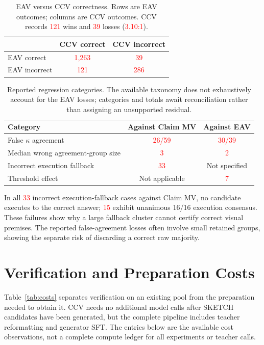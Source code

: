 \documentclass{article}
\newcommand{\recheck}[1]{\textcolor{red}{#1}}
\begin{document}
\begin{table}[h]
\centering
\caption{EAV versus CCV correctness. Rows are EAV outcomes; columns are CCV outcomes. CCV records \recheck{121} wins and \recheck{39} losses (\recheck{3.10:1}).}
\label{tab:exchange-eav}
\small
\begin{tabular}{lcc}
\toprule
 & CCV correct & CCV incorrect \\
\midrule
EAV correct & \recheck{1,263} & \recheck{39} \\
EAV incorrect & \recheck{121} & \recheck{286} \\
\bottomrule
\end{tabular}
\end{table}

\begin{table}[h]
\centering
\caption{Reported regression categories. The available taxonomy does not exhaustively account for the EAV losses; categories and totals await reconciliation rather than assigning an unsupported residual.}
\label{tab:regression-types}
\small
\begin{tabular}{lcc}
\toprule
Category & Against Claim MV & Against EAV \\
\midrule
False $\kappa$ agreement & \recheck{26/59} & \recheck{30/39} \\
Median wrong agreement-group size & \recheck{3} & \recheck{2} \\
Incorrect execution fallback & \recheck{33} & Not specified \\
Threshold effect & Not applicable & \recheck{7} \\
\bottomrule
\end{tabular}
\end{table}

In all \recheck{33} incorrect execution-fallback cases against Claim MV, no candidate executes to the correct answer; \recheck{15} exhibit unanimous 16/16 execution consensus. These failures show why a large fallback cluster cannot certify correct visual premises. The reported false-agreement losses often involve small retained groups, showing the separate risk of discarding a correct raw majority.

\section{Verification and Preparation Costs}
\label{app:costs}

Table~\ref{tab:costs} separates verification on an existing pool from the preparation needed to obtain it. CCV needs no additional model calls after SKETCH candidates have been generated, but the complete pipeline includes teacher reformatting and generator SFT. The entries below are the available cost observations, not a complete compute ledger for all experiments or teacher calls.
\end{document}
